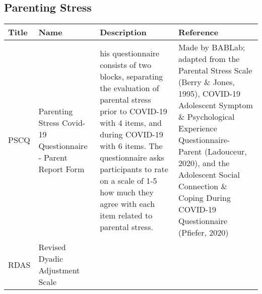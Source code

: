 \documentclass[]{book}
\begin{document}
\hypertarget{parenting-stress}{%
\subsection{Parenting Stress}\label{parenting-stress}}

\begin{longtable}[]{@{}llll@{}}
\toprule
\begin{minipage}[b]{0.22\columnwidth}\raggedright
Title\strut
\end{minipage} & \begin{minipage}[b]{0.27\columnwidth}\raggedright
Name\strut
\end{minipage} & \begin{minipage}[b]{0.22\columnwidth}\raggedright
Description\strut
\end{minipage} & \begin{minipage}[b]{0.18\columnwidth}\raggedright
Reference\strut
\end{minipage}\tabularnewline
\midrule
\endhead
\begin{minipage}[t]{0.22\columnwidth}\raggedright
PSCQ\strut
\end{minipage} & \begin{minipage}[t]{0.27\columnwidth}\raggedright
Parenting Stress Covid-19 Questionnaire - Parent Report Form\strut
\end{minipage} & \begin{minipage}[t]{0.22\columnwidth}\raggedright
his questionnaire consists of two blocks, separating the evaluation of parental stress prior to COVID-19 with 4 items, and during COVID-19 with 6 items. The questionnaire asks participants to rate on a scale of 1-5 how much they agree with each item related to parental stress.\strut
\end{minipage} & \begin{minipage}[t]{0.18\columnwidth}\raggedright
Made by BABLab; adapted from the Parental Stress Scale (Berry \& Jones, 1995), COVID-19 Adolescent Symptom \& Psychological Experience Questionnaire- Parent (Ladouceur, 2020), and the Adolescent Social Connection \& Coping During COVID-19 Questionnaire (Pfiefer, 2020)\strut
\end{minipage}\tabularnewline
\begin{minipage}[t]{0.22\columnwidth}\raggedright
RDAS\strut
\end{minipage} & \begin{minipage}[t]{0.27\columnwidth}\raggedright
Revised Dyadic Adjustment Scale\strut
\end{minipage} & \begin{minipage}[t]{0.22\columnwidth}\raggedright

\end{minipage}
\end{longtable}
\end{document}

